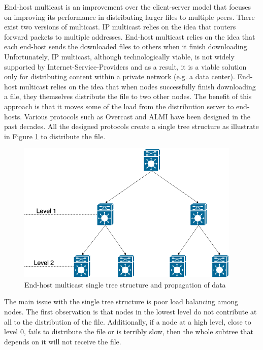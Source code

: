 {{End-host multicast is an improvement over the client-server model that focuses on improving its performance in distributing larger files to multiple peers. There exist two versions of multicast. IP multicast relies on the idea that routers forward packets to multiple addresses. End-host multicast relies on the idea that each end-host sends the downloaded files to others when it finish downloading. Unfortunately, IP multicast, although technologically viable, is not widely supported by Internet-Service-Providers and as a result, it is a viable solution only for distributing content within a private network (e.g. a data center). End-host multicast relies on the idea that when nodes successfully finish downloading a file, they themselves distribute the file to two other nodes. The benefit of this approach is that it moves some of the load from the distribution server to end-hosts. Various protocols such as Overcast \cite{jannotti2000overcast} and ALMI \cite{verma2001almi} have been designed in the past decades. All the designed protocols create a single tree structure as illustrate in Figure \ref{fig:ipMulti} to distribute the file.

\begin{figure}[htb!]
\centering
\includegraphics[width=0.95\textwidth]{./pics/Ip-multi.png}
\caption{End-host multicast single tree structure and propagation of data}
\label{fig:ipMulti}
\end{figure}

The main issue with the single tree structure is poor load balancing among nodes. The first observation is that nodes in the lowest level do not contribute at all to the distribution of the file. Additionally, if a node at a high level, close to level 0, fails to distribute the file or is terribly slow, then the whole subtree that depends on it will not receive the file.

}}
